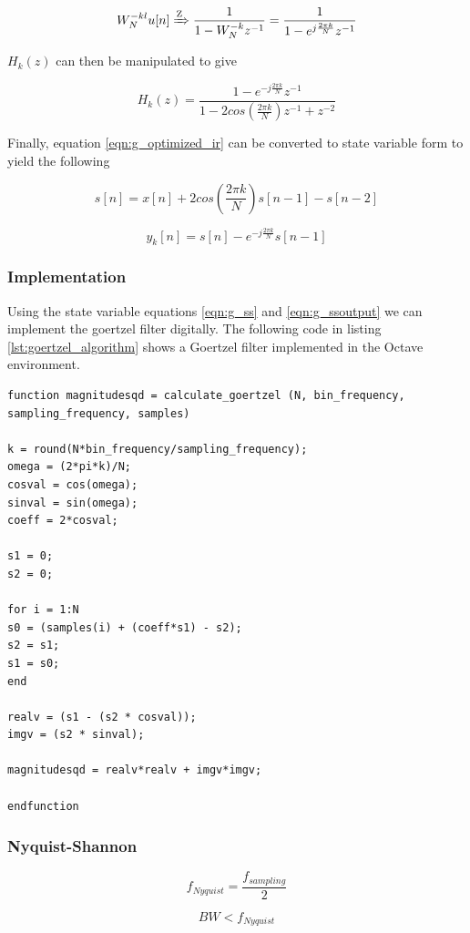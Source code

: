 \begin{equation}
W_N^{-kl}u[n] \xRightarrow{\text{Z}} \frac{1}{1 - W_N^{-k}z^{-1}} = \frac{1}{1 - e^{j\frac{2\pi k}{N}}z^{-1}}
\end{equation}

$H_k(z)$ can then be manipulated to give

\begin{equation}
\label{eqn:g_optimized_ir}
H_k(z) = \frac{1 - e^{-j\frac{2\pi k}{N}}z^{-1}}{1 - 2cos(\frac{2\pi k}{N})z^{-1} + z^{-2}}
\end{equation}

Finally, equation \ref{eqn:g_optimized_ir} can be converted to state variable form to yield the following


\begin{equation}
\label{eqn:g_ss}
s[n] = x[n]+2cos(\frac{2\pi k}{N})s[n-1]-s[n-2]
\end{equation}


\begin{equation}
\label{eqn:g_ssoutput}
y_k[n] = s[n]-e^{-j\frac{2\pi k}{N}}s[n-1]
\end{equation}



\subsubsection{Implementation}
\label{sec:goertzel_implementation}
Using the state variable equations \ref{eqn:g_ss} and \ref{eqn:g_ssoutput} we can implement the goertzel filter digitally. The following code in listing \ref{lst:goertzel_algorithm} shows a Goertzel filter implemented in the Octave environment.

\begin{lstlisting}[caption={Goertzel Algorithm - Octave Implementation\label{lst:goertzel_algorithm}}]
function magnitudesqd = calculate_goertzel (N, bin_frequency, sampling_frequency, samples)

k = round(N*bin_frequency/sampling_frequency);
omega = (2*pi*k)/N;
cosval = cos(omega);
sinval = sin(omega);
coeff = 2*cosval;

s1 = 0;
s2 = 0;

for i = 1:N
s0 = (samples(i) + (coeff*s1) - s2);
s2 = s1;
s1 = s0;    
end

realv = (s1 - (s2 * cosval));
imgv = (s2 * sinval);  

magnitudesqd = realv*realv + imgv*imgv;

endfunction
\end{lstlisting}

\subsubsection{Nyquist-Shannon}

\[f_{Nyquist} = \frac{f_{sampling}}{2}\]

\begin{equation}
\label{eqn:sampling_frequency}
BW < f_{Nyquist}
\end{equation}












